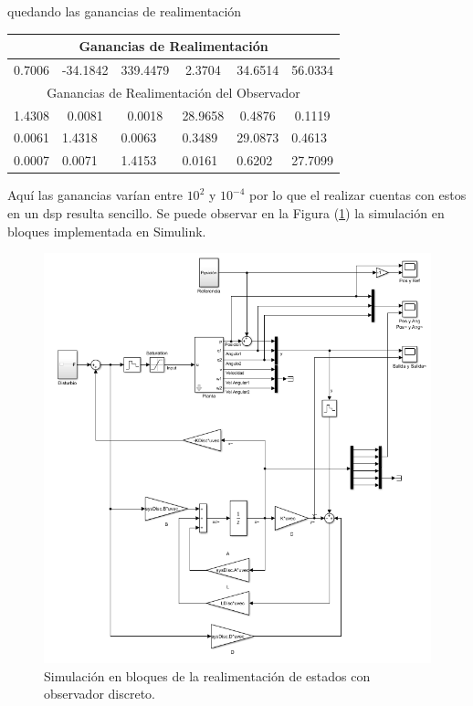 quedando las ganancias de realimentación

\begin{table}[H]
\centering
\begin{tabular}{@{}clllll@{}}
\toprule
\multicolumn{6}{c}{Ganancias de Realimentación}                           \\ \midrule
0.7006 & \multicolumn{1}{c}{-34.1842} & \multicolumn{1}{c}{339.4479} & \multicolumn{1}{c}{2.3704}  & \multicolumn{1}{c}{34.6514} & \multicolumn{1}{c}{56.0334} \\ \midrule
\multicolumn{6}{c}{Ganancias de Realimentación del Observador}            \\ \midrule
1.4308 & \multicolumn{1}{c}{0.0081}   & \multicolumn{1}{c}{0.0018}   & \multicolumn{1}{c}{28.9658} & \multicolumn{1}{c}{0.4876}  & \multicolumn{1}{c}{0.1119}  \\
\multicolumn{1}{l}{0.0061} & 1.4318 & 0.0063 & 0.3489 & 29.0873 & 0.4613  \\
\multicolumn{1}{l}{0.0007} & 0.0071 & 1.4153 & 0.0161 & 0.6202  & 27.7099 \\ \bottomrule
\end{tabular}
\end{table}
Aquí las ganancias varían entre $10^2$ y $10^{-4}$ por lo que el realizar cuentas con estos en un dsp resulta sencillo.
Se puede observar en la Figura (\ref{fig:obsv_disc}) la simulación en bloques implementada en Simulink.

\begin{figure}[H]
	\centering
	\includegraphics[width=\linewidth]{../Modelo de Control/ImagenesModelo de Control/obsv_disc.png}
	\caption{Simulación en bloques de la realimentación de estados con observador discreto.}	
	\label{fig:obsv_disc}
\end{figure}



%